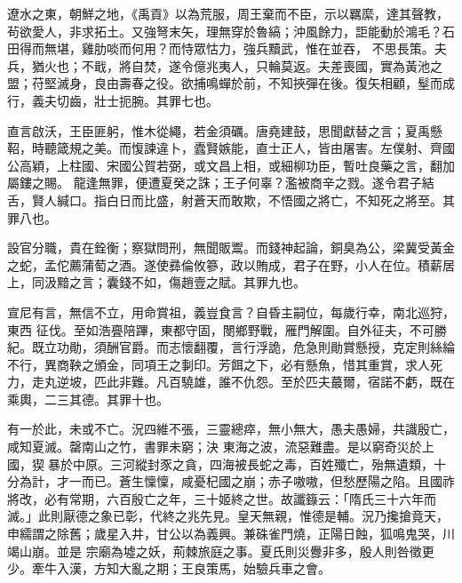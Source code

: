 \begin{pinyinscope}
 遼水之東，朝鮮之地，《禹貢》以為荒服，周王棄而不臣，示以羈縻，達其聲教，茍欲愛人，非求拓土。又強弩末矢，理無穿於魯縞；沖風餘力，詎能動於鴻毛？石田得而無堪，雞肋啖而何用？而恃眾怙力，強兵黷武，惟在並吞，
 不思長策。夫兵，猶火也；不戢，將自焚，遂令億兆夷人，只輪莫返。夫差喪國，實為黃池之盟；苻堅滅身，良由壽春之役。欲捕鳴蟬於前，不知挾彈在後。復矢相顧，髽而成行，義夫切齒，壯士扼腕。其罪七也。



 直言啟沃，王臣匪躬，惟木從繩，若金須礪。唐堯建鼓，思聞獻替之言；夏禹懸鞀，時聽箴規之美。而愎諫違卜，蠹賢嫉能，直士正人，皆由屠害。左僕射、齊國公高穎，上柱國、宋國公賀若弼，或文昌上相，或細柳功臣，暫吐良藥之言，翻加屬鏤之賜。
 龍逢無罪，便遭夏癸之誅；王子何辜？濫被商辛之戮。遂令君子結舌，賢人緘口。指白日而比盛，射蒼天而敢欺，不悟國之將亡，不知死之將至。其罪八也。



 設官分職，貴在銓衡；察獄問刑，無聞販鬻。而錢神起論，銅臭為公，梁冀受黃金之蛇，孟佗薦蒲萄之酒。遂使彞倫攸篸，政以賄成，君子在野，小人在位。積薪居上，同汲黯之言；囊錢不如，傷趙壹之賦。其罪九也。



 宣尼有言，無信不立，用命賞祖，義豈食言？自昏主嗣位，每歲行幸，南北巡狩，東西
 征伐。至如浩亹陪蹕，東都守固，閿鄉野戰，雁門解圍。自外征夫，不可勝紀。既立功勛，須酬官爵。而志懷翻覆，言行浮詭，危急則勛賞懸授，克定則絲綸不行，異商鞅之頒金，同項王之剚印。芳餌之下，必有懸魚，惜其重賞，求人死力，走丸逆坡，匹此非難。凡百驍雄，誰不仇怨。至於匹夫蕞爾，宿諾不虧，既在乘輿，二三其德。其罪十也。



 有一於此，未或不亡。況四維不張，三靈總瘁，無小無大，愚夫愚婦，共識殷亡，咸知夏滅。罄南山之竹，書罪未窮；決
 東海之波，流惡難盡。是以窮奇災於上國，猰暴於中原。三河縱封豕之貪，四海被長蛇之毒，百姓殲亡，殆無遺類，十分為計，才一而已。蒼生懍懍，咸憂杞國之崩；赤子嗷嗷，但愁歷陽之陷。且國祚將改，必有常期，六百殷亡之年，三十姬終之世。故讖籙云：「隋氏三十六年而滅。」此則厭德之象已彰，代終之兆先見。皇天無親，惟德是輔。況乃攙搶竟天，申繻謂之除舊；歲星入井，甘公以為義興。兼硃雀門燒，正陽日蝕，狐鳴鬼哭，川竭山崩。並是
 宗廟為墟之妖，荊棘旅庭之事。夏氏則災釁非多，殷人則咎徵更少。牽牛入漢，方知大亂之期；王良策馬，始驗兵車之會。




\end{pinyinscope}
